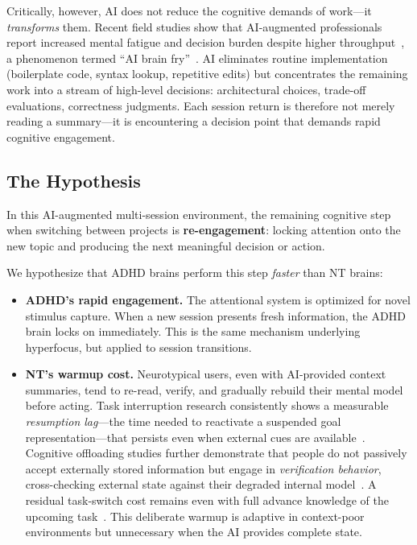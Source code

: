 \documentclass[sigconf,nonacm]{acmart}
\begin{document}
Critically, however, AI does not reduce the cognitive demands of work---it \emph{transforms} them. Recent field studies show that AI-augmented professionals report increased mental fatigue and decision burden despite higher throughput~\cite{ranganathan2026}, a phenomenon termed ``AI brain fry''~\cite{bedard2026}. AI eliminates routine implementation (boilerplate code, syntax lookup, repetitive edits) but concentrates the remaining work into a stream of high-level decisions: architectural choices, trade-off evaluations, correctness judgments. Each session return is therefore not merely reading a summary---it is encountering a decision point that demands rapid cognitive engagement.

\subsection{The Hypothesis}

In this AI-augmented multi-session environment, the remaining cognitive step when switching between projects is \textbf{re-engagement}: locking attention onto the new topic and producing the next meaningful decision or action.

We hypothesize that ADHD brains perform this step \emph{faster} than NT brains:

\begin{itemize}
  \item \textbf{ADHD's rapid engagement.} The attentional system is optimized for novel stimulus capture. When a new session presents fresh information, the ADHD brain locks on immediately. This is the same mechanism underlying hyperfocus, but applied to session transitions.
  \item \textbf{NT's warmup cost.} Neurotypical users, even with AI-provided context summaries, tend to re-read, verify, and gradually rebuild their mental model before acting. Task interruption research consistently shows a measurable \emph{resumption lag}---the time needed to reactivate a suspended goal representation---that persists even when external cues are available~\cite{altmann2002, trafton2003}. Cognitive offloading studies further demonstrate that people do not passively accept externally stored information but engage in \emph{verification behavior}, cross-checking external state against their degraded internal model~\cite{risko2016}. A residual task-switch cost remains even with full advance knowledge of the upcoming task~\cite{monsell2003}. This deliberate warmup is adaptive in context-poor environments but unnecessary when the AI provides complete state.
\end{itemize}
\end{document}
